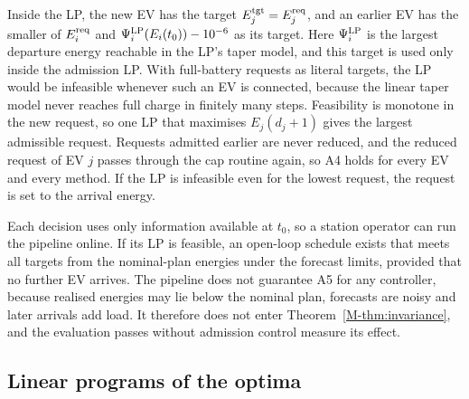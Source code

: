 Inside the LP, the new EV has the target $E_j^{\mathrm{tgt}}=E^{\mathrm{req}}_j$, and an earlier EV has the smaller of $E^{\mathrm{req}}_i$ and $\Psi_i^{\mathrm{LP}}(E_i(t_0))-10^{-6}$ as its target.
Here $\Psi_i^{\mathrm{LP}}$ is the largest departure energy reachable in the LP's taper model, and this target is used only inside the admission LP.
With full-battery requests as literal targets, the LP would be infeasible whenever such an EV is connected, because the linear taper model never reaches full charge in finitely many steps.
Feasibility is monotone in the new request, so one LP that maximises $E_j(d_j+1)$ gives the largest admissible request.
Requests admitted earlier are never reduced, and the reduced request of EV $j$ passes through the cap routine again, so A4 holds for every EV and every method.
If the LP is infeasible even for the lowest request, the request is set to the arrival energy.

Each decision uses only information available at $t_0$, so a station operator can run the pipeline online.
If its LP is feasible, an open-loop schedule exists that meets all targets from the nominal-plan energies under the forecast limits, provided that no further EV arrives.
The pipeline does not guarantee A5 for any controller, because realised energies may lie below the nominal plan, forecasts are noisy and later arrivals add load.
It therefore does not enter Theorem~\ref{M-thm:invariance}, and the evaluation passes without admission control measure its effect.

\subsection{Linear programs of the optima}\label{app:oracle}

